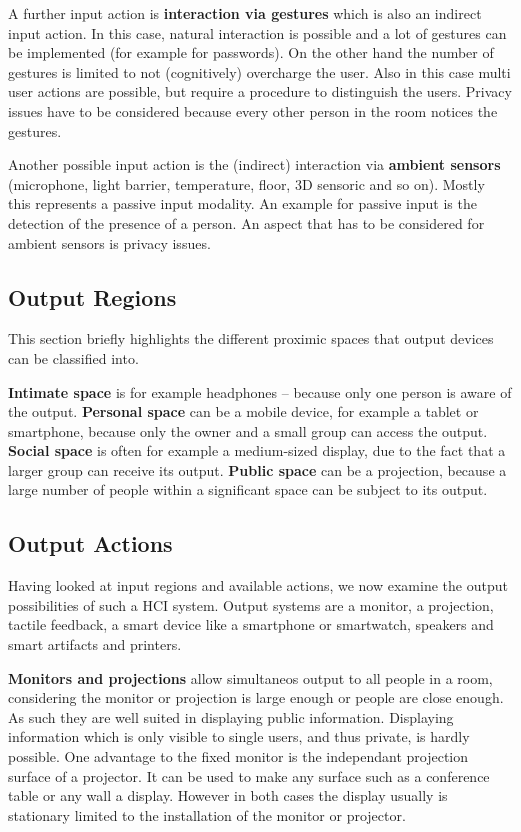 A further input action is \textbf{interaction via gestures} which is also an indirect input action.
In this case, natural interaction is possible and a lot of gestures can be implemented (for example for passwords).
On the other hand the number of gestures is limited to not (cognitively) overcharge the user.
Also in this case multi user actions are possible, but require a procedure to distinguish the users.
Privacy issues have to be considered because every other person in the room notices the gestures.

Another possible input action is the (indirect) interaction via \textbf{ambient sensors} (microphone, light barrier, temperature, floor, 3D sensoric and so on).
Mostly this represents a passive input modality.
An example for passive input is the detection of the presence of a person.
An aspect that has to be considered for ambient sensors is privacy issues.

\subsection{Output Regions}

This section briefly highlights the different proximic spaces that output devices can be classified into.

\textbf{Intimate space} is for example headphones – because only one person is aware of the output.
\textbf{Personal space} can be a mobile device, for example a tablet or smartphone, because only the owner and a small group can access the output.
\textbf{Social space} is often for example a medium-sized display, due to the fact that a larger group can receive its output.
\textbf{Public space} can be a projection, because a large number of people within a significant space can be subject to its output.

\subsection{Output Actions}

Having looked at input regions and available actions, we now examine the output possibilities of such a HCI system.
Output systems are a monitor, a projection, tactile feedback, a smart device like a smartphone or smartwatch, speakers and smart artifacts and printers.

\textbf{Monitors and projections} allow simultaneos output to all people in a room, considering the monitor or projection is large enough or people are close enough.
As such they are well suited in displaying public information.
Displaying information which is only visible to single users, and thus private, is hardly possible.
One advantage to the fixed monitor is the independant projection surface of a projector.
It can be used to make any surface such as a conference table or any wall a display.
However in both cases the display usually is stationary limited to the installation of the monitor or projector.


